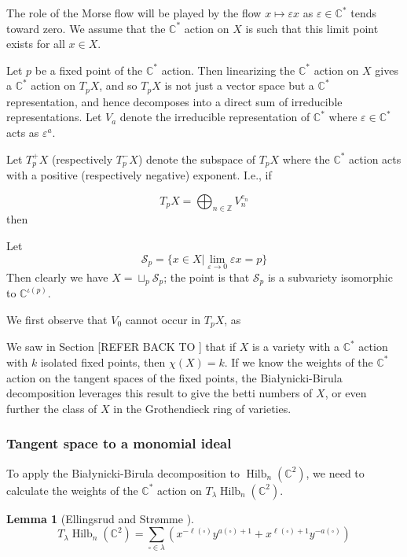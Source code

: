 \documentclass{amsart}[12pt]
\theoremstyle{definition}
\newtheorem{lemma}[dummy]{Lemma}
\newcommand{\Z}{\mathbb{Z}}
\newcommand{\C}{\mathbb{C}}
\DeclareMathOperator{\Hilb}{Hilb}
\begin{document}
The role of the Morse flow will be played by the flow $x\mapsto \varepsilon x$ as $\varepsilon\in\C^*$ tends toward zero.  We assume that the $\C^*$ action on $X$ is such that this limit point exists for all $x\in X$.  

Let $p$ be a fixed point of the $\C^*$ action.  Then linearizing the $\C^*$ action on $X$ gives a $\C^*$ action on $T_pX$, and so $T_pX$ is not just a vector space but a $\C^*$ representation, and hence decomposes into a direct sum of irreducible representations.  Let $V_a$ denote the irreducible representation of $\C^*$ where $\varepsilon\in\C^*$ acts as $\varepsilon^a$.  

Let $T_p^+X$ (respectively $T_p^-X$) denote the subspace of $T_pX$ where the $\C^*$ action acts with a positive (respectively negative) exponent.  I.e., if

$$T_pX=\bigoplus_{n\in\Z} V_n^{e_n}$$
then

Let 
$$\mathcal{S}_p=\{x\in X|\lim_{\varepsilon\to 0} \varepsilon x=p\}$$
Then clearly we have $X=\sqcup_{p}\mathcal{S}_p$; the point is that $\mathcal{S}_p$ is a subvariety isomorphic to $\C^{\iota(p)}$.



We first observe that $V_0$ cannot occur in $T_pX$, as 

We saw in Section [REFER BACK TO ] that if $X$ is a variety with a $\C^*$ action with $k$ isolated fixed points, then $\chi(X)=k$.  If we know the weights of the $\C^*$ action on the tangent spaces of the fixed points, the Bia\l ynicki-Birula decomposition leverages this result to give the betti numbers of $X$, or even further the class of $X$ in the Grothendieck ring of varieties.

\subsubsection{Tangent space to a monomial ideal}
To apply the Bia\l ynicki-Birula decomposition to $\Hilb_n(\C^2)$, we need to calculate the weights of the $\C^*$ action on $T_\lambda\Hilb_n(\C^2)$.

\begin{lemma}[Ellingsrud and Str\o mme \cite{ES}] \label{lem:torus-weights}
$$T_\lambda \Hilb_n(\C^2)=\sum_{\square\in\lambda} \left(x^{-\ell(\square)} y^{a(\square)+1}+x^{\ell(\square)+1}y^{-a(\square)}\right)$$
\end{lemma}
\end{document}
